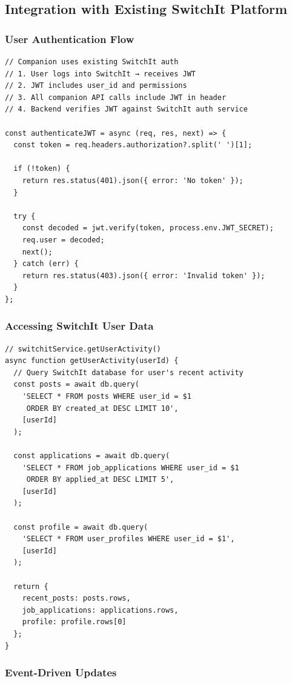 \documentclass[12pt,a4paper]{article}
\begin{document}
\subsection{Integration with Existing SwitchIt Platform}

\subsubsection{User Authentication Flow}

\begin{verbatim}
// Companion uses existing SwitchIt auth
// 1. User logs into SwitchIt → receives JWT
// 2. JWT includes user_id and permissions
// 3. All companion API calls include JWT in header
// 4. Backend verifies JWT against SwitchIt auth service

const authenticateJWT = async (req, res, next) => {
  const token = req.headers.authorization?.split(' ')[1];
  
  if (!token) {
    return res.status(401).json({ error: 'No token' });
  }
  
  try {
    const decoded = jwt.verify(token, process.env.JWT_SECRET);
    req.user = decoded;
    next();
  } catch (err) {
    return res.status(403).json({ error: 'Invalid token' });
  }
};
\end{verbatim}

\subsubsection{Accessing SwitchIt User Data}

\begin{verbatim}
// switchitService.getUserActivity()
async function getUserActivity(userId) {
  // Query SwitchIt database for user's recent activity
  const posts = await db.query(
    'SELECT * FROM posts WHERE user_id = $1 
     ORDER BY created_at DESC LIMIT 10',
    [userId]
  );
  
  const applications = await db.query(
    'SELECT * FROM job_applications WHERE user_id = $1 
     ORDER BY applied_at DESC LIMIT 5',
    [userId]
  );
  
  const profile = await db.query(
    'SELECT * FROM user_profiles WHERE user_id = $1',
    [userId]
  );
  
  return {
    recent_posts: posts.rows,
    job_applications: applications.rows,
    profile: profile.rows[0]
  };
}
\end{verbatim}

\subsubsection{Event-Driven Updates}
\end{document}
